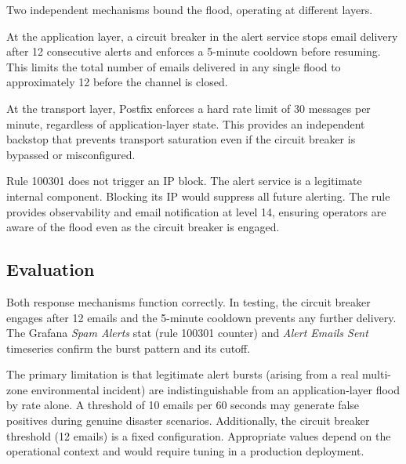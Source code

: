 Two independent mechanisms bound the flood, operating at different layers.

At the application layer, a circuit breaker in the alert service stops email
delivery after 12 consecutive alerts and enforces a 5-minute cooldown before
resuming. This limits the total number of emails delivered in any single flood
to approximately 12 before the channel is closed.

At the transport layer, Postfix enforces a hard rate limit of 30 messages per
minute, regardless of application-layer state. This provides an independent
backstop that prevents transport saturation even if the circuit breaker is
bypassed or misconfigured.

Rule 100301 does not trigger an IP block. The alert service is a legitimate
internal component. Blocking its IP would suppress all future alerting. The rule
provides observability and email notification at level 14, ensuring operators are
aware of the flood even as the circuit breaker is engaged.

\subsection{Evaluation}

Both response mechanisms function correctly. In testing, the circuit breaker
engages after 12 emails and the 5-minute cooldown prevents any further delivery.
The Grafana \emph{Spam Alerts} stat (rule 100301 counter) and \emph{Alert Emails
Sent} timeseries confirm the burst pattern and its cutoff.

The primary limitation is that legitimate alert bursts (arising from a real
multi-zone environmental incident) are indistinguishable from an application-layer
flood by rate alone. A threshold of 10 emails per 60 seconds may generate false
positives during genuine disaster scenarios. Additionally, the circuit breaker
threshold (12 emails) is a fixed configuration. Appropriate values depend on the
operational context and would require tuning in a production deployment.
